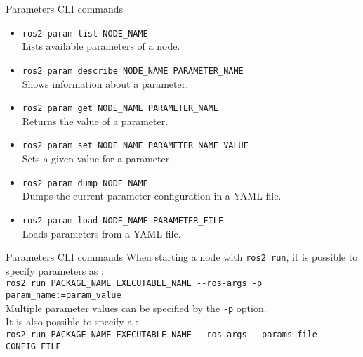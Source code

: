 \begin{frame}{Parameters CLI commands}
	\begin{itemize}
		\item \texttt{ros2 param list NODE\_NAME}\\Lists available parameters of a node.
		\item \texttt{ros2 param describe NODE\_NAME PARAMETER\_NAME}\\Shows information about a parameter.
		\item \texttt{ros2 param get NODE\_NAME PARAMETER\_NAME}\\Returns the value of a parameter.
		\item \texttt{ros2 param set NODE\_NAME PARAMETER\_NAME VALUE}\\Sets a given value for a parameter.
		\item \texttt{ros2 param dump NODE\_NAME}\\Dumps the current parameter configuration in a YAML file.
		\item \texttt{ros2 param load NODE\_NAME PARAMETER\_FILE}\\Loads parameters from a YAML file.
	\end{itemize}
\end{frame}
\begin{frame}{Parameters CLI commands}
  When starting a node with \texttt{ros2 run}, it is possible to specify parameters as :\\
  \bigskip
  \texttt{ros2 run PACKAGE\_NAME EXECUTABLE\_NAME -{}-ros-args -p param\_name:=param\_value}\\
  \bigskip
  Multiple parameter values can be specified by  the \texttt{-p} option.\\
  It is also possible to specify a :\\
  \bigskip
  \texttt{ros2 run PACKAGE\_NAME EXECUTABLE\_NAME -{}-ros-args -{}-params-file CONFIG\_FILE}
\end{frame}

